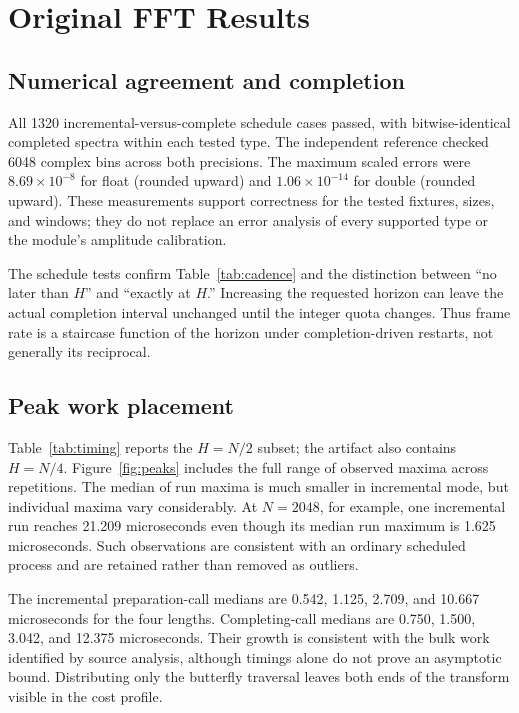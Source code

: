 \section{Original FFT Results}
\label{sec:legacy-results}
\subsection{Numerical agreement and completion}
All 1320 incremental-versus-complete schedule cases passed, with bitwise-identical
completed spectra within each tested type. The independent reference checked
6048 complex bins across both precisions. The maximum scaled errors were
$8.69\times10^{-8}$ for float (rounded upward) and
$1.06\times10^{-14}$ for double (rounded upward). These measurements support
correctness for the tested fixtures, sizes, and windows; they do not replace an
error analysis of every supported type or the module's amplitude calibration.

The schedule tests confirm Table~\ref{tab:cadence} and the distinction between
``no later than $H$'' and ``exactly at $H$.'' Increasing the requested horizon
can leave the actual completion interval unchanged until the integer quota
changes. Thus frame rate is a staircase function of the horizon under
completion-driven restarts, not generally its reciprocal.

\subsection{Peak work placement}
Table~\ref{tab:timing} reports the $H=N/2$ subset; the artifact also contains
$H=N/4$. Figure~\ref{fig:peaks} includes the full range of observed maxima across
repetitions. The median of run maxima is much smaller in incremental mode,
but individual maxima vary considerably. At $N=2048$, for example, one
incremental run reaches 21.209 microseconds even though its median run maximum
is 1.625 microseconds. Such observations are consistent with an ordinary
scheduled process and are retained rather than removed as outliers.





The incremental preparation-call medians are 0.542, 1.125, 2.709, and
10.667 microseconds for the four lengths. Completing-call medians are 0.750,
1.500, 3.042, and 12.375 microseconds. Their growth is consistent with the bulk
work identified by source analysis, although timings alone do not prove an
asymptotic bound. Distributing only the butterfly traversal leaves both ends of
the transform visible in the cost profile.

